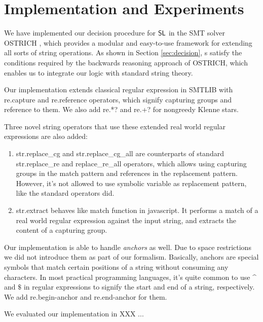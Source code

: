 
\section{Implementation and Experiments}
\label{sect:impl}

We have implemented our decision procedure for $\mathsf{SL}$ in the SMT solver OSTRICH \cite{CHL+19}, which provides a modular and easy-to-use framework for extending all sorts of string operations. As shown in Section \ref{sec:decision}, \PSST s satisfy the conditions required by the backwards reasoning approach of OSTRICH, which enables us to integrate our logic with standard string theory.

Our implementation extends classical regular expression in SMTLIB with {\sf re.capture} and {\sf re.reference} operators, which signify capturing groups and reference to them. We also add {\sf re.*?} and {\sf re.+?} for nongreedy Klenne stars.

Three novel string operators that use these extended real world regular expressions are also added:

\begin{enumerate}
  \item {\sf str.replace\_cg} and {\sf str.replace\_cg\_all} are
  counterparts of standard {\sf str.replace\_re} and
  {\sf replace\_re\_all} operators, which allows using
  capturing groups in the match pattern and references
  in the replacement pattern. However, it's not allowed to use symbolic
  variable as replacement pattern, like the standard operators did.
  
  \item {\sf str.extract} behaves like {\sf match} function in
  javascript. It performs a match of a real world regular expression against
  the input string, and extracts the content of a capturing group.
\end{enumerate}

Our implementation is able to handle \textit{anchors} as well. Due to space restrictions we did not introduce them as part of our formalism. Basically, anchors are special symbols that match certain positions of a string without consuming any characters. In most practical programming languages, it's quite common to use \^{} and $\$$ in regular expressions to signify the start and end of a string, respectively. We add \textsf{re.begin-anchor} and \textsf{re.end-anchor} for them.

We evaluated our implementation in XXX ...

